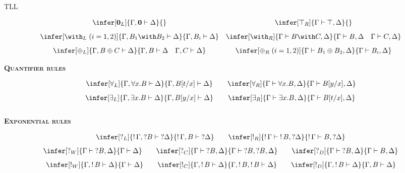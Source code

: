 \begin{entry}{TLL}
\begin{calculus}
\[\begin{array}{cc}
\infer[\zero_L]{\Gamma,\zero \vdash\Delta}{}&
\infer[\top_R]{\Gamma \vdash\top, \Delta}{}
  \\[8pt]
\infer[\with_L\;(i=1,2)]{\Gamma,B_1\with B_2\vdash \Delta}{\Gamma,B_i\vdash \Delta}
& 
\infer[\with_R]{\Gamma \vdash B\with C, \Delta}{\Gamma \vdash B,\Delta\quad\Gamma \vdash C,\Delta}
\\[8pt]
 \infer[\oplus_L]{\Gamma,B\oplus C \vdash \Delta}{\Gamma,B\vdash \Delta \quad \Gamma,C\vdash \Delta}
  &
  \infer[\oplus_R\;(i=1,2)]{\Gamma \vdash B_1\oplus B_2, \Delta}{\Gamma \vdash B_i,\Delta}
\end{array}
\]
\begin{center}
 \textsc{\bf Quantifier rules}
\end{center}
\vspace{-7px}
\[
\begin{array}{cc}
\infer[\forall_L]{\Gamma,\forall x.B\vdash \Delta}{\Gamma,B[t/x]\vdash \Delta}\quad
& 
\infer[\forall_R]{\Gamma \vdash \forall x.B, \Delta}{\Gamma \vdash B[y/x],\Delta}
\\[8pt]
\infer[\exists_L]{\Gamma,\exists x.B\vdash \Delta}{\Gamma,B[y/x]\vdash \Delta}\quad
& 
\infer[\exists_R]{\Gamma \vdash \exists x.B, \Delta}{\Gamma \vdash B[t/x],\Delta}
\\[8pt]
\end{array}
\]
\begin{center}
 \textsc{\bf Exponential rules}
\end{center}
\vspace{-7px}
\[
\begin{array}{cc}
\infer[\quest_L]{\bang\Gamma,\quest B\vdash \quest\Delta}{\bang\Gamma,B\vdash \quest\Delta}\quad
& 
\infer[\bang_R]{\bang\Gamma\vdash \bang B,\quest\Delta}{\bang\Gamma\vdash B, \quest\Delta}
\end{array}
\]
\[
\begin{array}{ccc}
\infer[\quest_W]{\Gamma\vdash \quest B,\Delta}{\Gamma\vdash \Delta}\quad
& 
\infer[\quest_C]{\Gamma\vdash \quest B,\Delta}{\Gamma\vdash \quest B,\quest B, \Delta}\quad
& 
\infer[\quest_D]{\Gamma\vdash \quest B,\Delta}{\Gamma\vdash B, \Delta}
\end{array}
\]
\[
\begin{array}{ccc}
\infer[\bang_W]{\Gamma,\bang B\vdash \Delta}{\Gamma\vdash \Delta}\quad
& 
\infer[\bang_C]{\Gamma,\bang B\vdash \Delta}{\Gamma,\bang B,\bang B\vdash \Delta}\quad
& 
\infer[\bang_D]{\Gamma,\bang B\vdash \Delta}{\Gamma, B\vdash \Delta}
\end{array}
\]


\end{calculus}
\end{entry}
